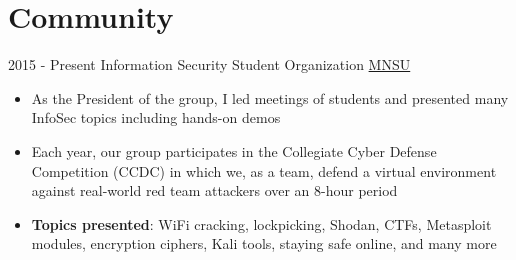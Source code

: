 \documentclass[letterpaper]{twentysecondcv} %
\begin{document}
\section{Community}

\begin{twenty}
    \twentyitem
    	{2015 -}
		{Present}
        {Information Security Student Organization}
        {\href{https://mankato.mnsu.edu/}{MNSU}}
        {}
        {\begin{itemize}
        \item As the President of the group, I led meetings of students and presented many InfoSec topics including hands-on demos
        \item Each year, our group participates in the Collegiate Cyber Defense Competition (CCDC) in which we, as a team, defend a virtual environment against real-world red team attackers over an 8-hour period
        \item \textbf{Topics presented}: WiFi cracking, lockpicking, Shodan, CTFs, Metasploit modules, encryption ciphers, Kali tools, staying safe online, and many more
        \end{itemize}}
\end{twenty}
\end{document}
